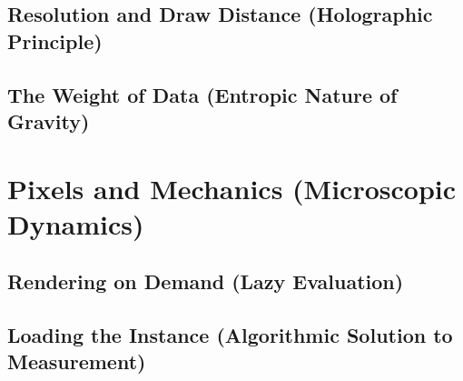 \documentclass[11pt,a4paper,twoside]{book}
\begin{document}
\chapter{Resolution and Draw Distance (Holographic Principle)}



\chapter{The Weight of Data (Entropic Nature of Gravity)}



\part{Pixels and Mechanics (Microscopic Dynamics)}

\chapter{Rendering on Demand (Lazy Evaluation)}



\chapter{Loading the Instance (Algorithmic Solution to Measurement)}


\end{document}
